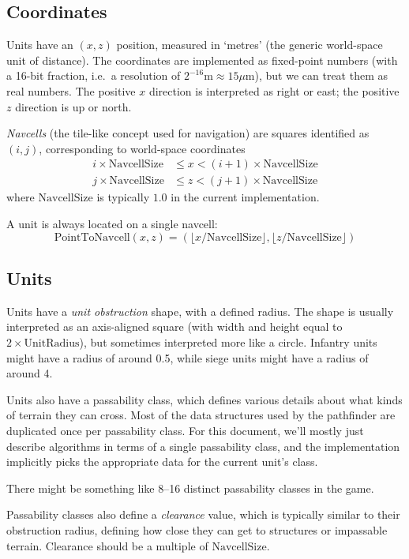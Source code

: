 \documentclass[a4paper,10pt]{article}
\begin{document}
\subsection{Coordinates}

Units have an $(x, z)$ position, measured in `metres' (the generic world-space unit of distance).
The coordinates are implemented as fixed-point numbers
(with a 16-bit fraction, i.e.\ a resolution of $2^{-16}\mathrm{m} \approx 15\mu\mathrm{m}$),
but we can treat them as real numbers.
The positive $x$ direction is interpreted as right or east; the positive $z$ direction is up or north.

\emph{Navcells} (the tile-like concept used for navigation)
are squares identified as $(i, j)$,
corresponding to world-space coordinates
\begin{align*}
i \times \mathrm{NavcellSize} & \leq x < (i+1) \times \mathrm{NavcellSize} \\
j \times \mathrm{NavcellSize} & \leq z < (j+1) \times \mathrm{NavcellSize}
\end{align*}
where $\mathrm{NavcellSize}$ is typically $1.0$ in the current implementation.

A unit is always located on a single navcell:
\[
\mathrm{PointToNavcell}(x, z) = (\lfloor x / \mathrm{NavcellSize} \rfloor, \lfloor z / \mathrm{NavcellSize} \rfloor)
\]

\subsection{Units}

Units have a \emph{unit obstruction} shape,
with a defined radius.
The shape is usually interpreted as an axis-aligned square
(with width and height equal to $2\times\mathrm{UnitRadius}$),
but sometimes interpreted more like a circle.
Infantry units might have a radius of around 0.5,
while siege units might have a radius of around 4.

Units also have a passability class,
which defines various details about what kinds of terrain they can cross.
Most of the data structures used by the pathfinder are
duplicated once per passability class.
For this document, we'll mostly just describe algorithms in terms of a single passability class,
and the implementation implicitly picks the appropriate data for the current unit's class.

There might be something like 8--16 distinct passability classes in the game.

Passability classes also define a \emph{clearance} value,
which is typically similar to their obstruction radius,
defining how close they can get to structures or impassable terrain.
Clearance should be a multiple of $\mathrm{NavcellSize}$.
\end{document}
